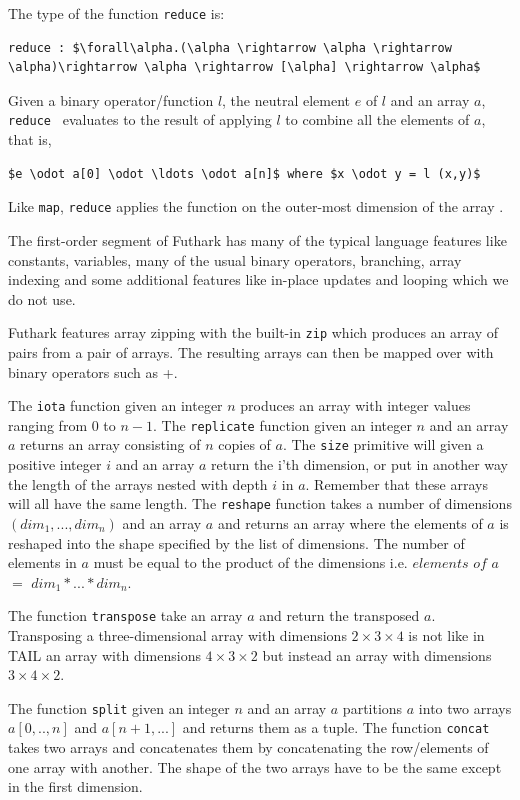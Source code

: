 \documentclass[11pt]{article}
\begin{document}
The type of the function {\tt reduce} is: 
\begin{lstlisting}[numbers=none,frame=none]
reduce : $\forall\alpha.(\alpha \rightarrow \alpha \rightarrow \alpha)\rightarrow \alpha \rightarrow [\alpha] \rightarrow \alpha$
\end{lstlisting}
Given a binary operator/function $l$, the neutral element $e$ of $l$ and an array $a$,
{\tt reduce } evaluates to the result of applying $l$ to combine all the elements of $a$, that is,
\begin{lstlisting}[numbers=none,frame=none]
$e \odot a[0] \odot \ldots \odot a[n]$ where $x \odot y = l (x,y)$
\end{lstlisting}
Like {\tt map}, {\tt reduce} applies the function on the outer-most dimension of the array \cite{TroelsHenriksen}.

The first-order segment of Futhark has many of the typical language features like constants, variables, many of the usual binary operators, branching, array indexing and some additional features like in-place updates and looping which we do not use.

Futhark features array zipping with the built-in {\tt zip} which produces an array of pairs from a pair of arrays.
The resulting arrays can then be mapped over with binary operators such as +.

The {\tt iota} function given an integer $n$ produces an array with integer values ranging from 0 to $n-1$.
The {\tt replicate} function given an integer $n$ and an array $a$ returns an array consisting of $n$ copies of $a$.
The {\tt size} primitive will given a positive integer $i$ and an array $a$ return the i'th dimension, or put in another way
the length of the arrays nested with depth $i$ in $a$. Remember that these arrays will all have the same length.
The {\tt reshape} function takes a number of dimensions $(dim_1,..., dim_n)$ and an array $a$ and returns an array where the elements of $a$ is reshaped into the shape specified by the list of dimensions.
The number of elements in $a$ must be equal to the product of the dimensions i.e. $elements$ $of$ $a$ $=$ $dim_1 * ... * dim_n$.

The function {\tt transpose} take an array $a$ and return the transposed $a$.
Transposing a three-dimensional array with dimensions $2 \times 3 \times 4$ is not like in TAIL an array with dimensions $4\times3\times2$ but instead an array with dimensions $3\times4\times2$.

The function {\tt split} given an integer $n$ and an array $a$ partitions $a$ into two arrays $a[0,..,n]$ and $a[n+1,...]$ and returns them as a tuple. 
The function {\tt concat} takes two arrays and concatenates them by concatenating the row/elements of one array with another. The shape of the two arrays have to be the same except in the first dimension. 
\end{document}
